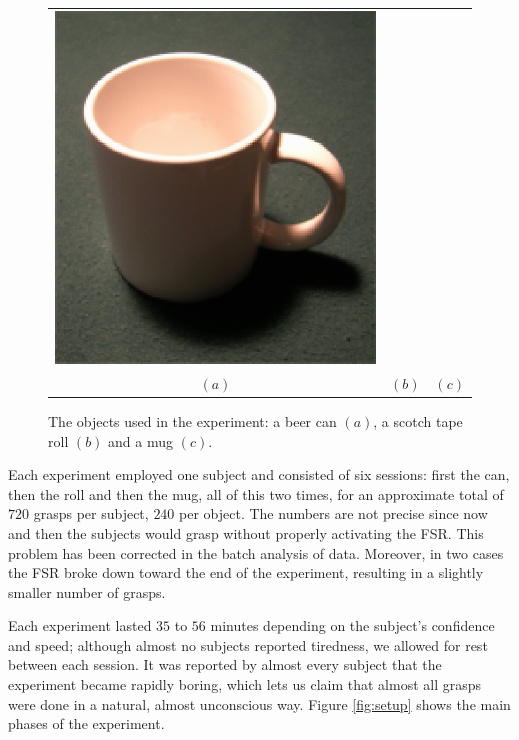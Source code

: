 \begin{figure}[htbp]
\begin{center}
\begin{tabular}{ccc}
      \includegraphics[height=0.2\textheight]{mug.eps} \\
      $(a)$ & $(b)$ & $(c)$
    \end{tabular}
    \caption{The objects used in the experiment: a beer can $(a)$, a
    scotch tape roll $(b)$ and a mug $(c)$.}
    \label{fig:objects}
  \end{center}
\end{figure}

Each experiment employed one subject and consisted of six sessions:
first the can, then the roll and then the mug, all of this two times,
for an approximate total of $720$ grasps per subject, $240$ per
object. The numbers are not precise since now and then the subjects
would grasp without properly activating the FSR. This problem has been
corrected in the batch analysis of data. Moreover, in two cases the
FSR broke down toward the end of the experiment, resulting in a
slightly smaller number of grasps.

Each experiment lasted $35$ to $56$ minutes depending on the subject's
confidence and speed; although almost no subjects reported tiredness,
we allowed for rest between each session. It was reported by almost
every subject that the experiment became rapidly boring, which lets us
claim that almost all grasps were done in a natural, almost
unconscious way. Figure \ref{fig:setup} shows the main phases of the
experiment.

